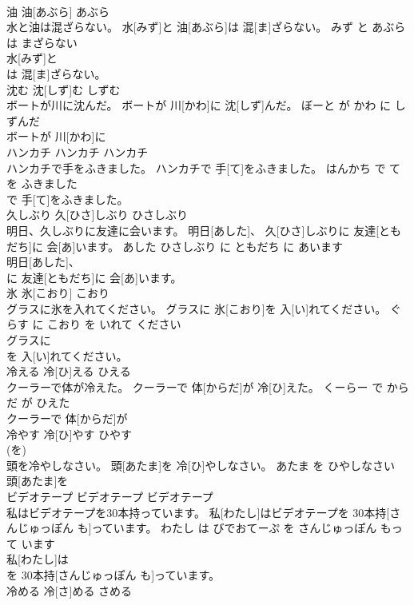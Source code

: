 \documentclass[8pt]{extreport}
\begin{document}
\begin{CJK}{UTF8}{min}
\\	油	油[あぶら]	あぶら	
\\	水と油は混ざらない。	水[みず]と 油[あぶら]は 混[ま]ざらない。	みず と あぶら は まざらない	
\\	水[みず]と
\\	は 混[ま]ざらない。		
\\	沈む	沈[しず]む	しずむ	
\\	ボートが川に沈んだ。	ボートが 川[かわ]に 沈[しず]んだ。	ぼーと が かわ に しずんだ	
\\	ボートが 川[かわ]に
\\	ハンカチ	ハンカチ	ハンカチ	
\\	ハンカチで手をふきました。	ハンカチで 手[て]をふきました。	はんかち で て を ふきました	
\\	で 手[て]をふきました。		
\\	久しぶり	久[ひさ]しぶり	ひさしぶり	
\\	明日、久しぶりに友達に会います。	明日[あした]、 久[ひさ]しぶりに 友達[ともだち]に 会[あ]います。	あした ひさしぶり に ともだち に あいます	
\\	明日[あした]、
\\	に 友達[ともだち]に 会[あ]います。		
\\	氷	氷[こおり]	こおり	
\\	グラスに氷を入れてください。	グラスに 氷[こおり]を 入[い]れてください。	ぐらす に こおり を いれて ください	
\\	グラスに
\\	を 入[い]れてください。		
\\	冷える	冷[ひ]える	ひえる	
\\	クーラーで体が冷えた。	クーラーで 体[からだ]が 冷[ひ]えた。	くーらー で からだ が ひえた	
\\	クーラーで 体[からだ]が
\\	冷やす	冷[ひ]やす	ひやす	
\\	(を)		
\\	頭を冷やしなさい。	頭[あたま]を 冷[ひ]やしなさい。	あたま を ひやしなさい	
\\	頭[あたま]を
\\	ビデオテープ	ビデオテープ	ビデオテープ	
\\	私はビデオテープを30本持っています。	私[わたし]はビデオテープを 30本持[さんじゅっぽん も]っています。	わたし は びでおてーぷ を さんじゅっぽん もって います	
\\	私[わたし]は
\\	を 30本持[さんじゅっぽん も]っています。		
\\	冷める	冷[さ]める	さめる	

\end{CJK}
\end{document}
